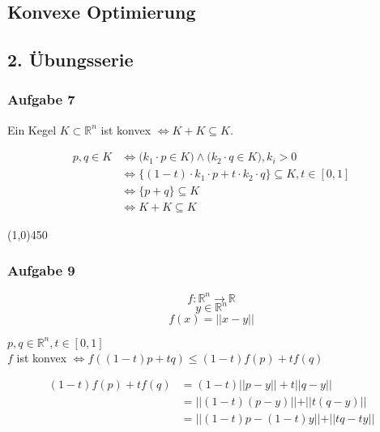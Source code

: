 \documentclass{article}
\newcommand{\hr}{\begin{center} \line(1,0){450} \end{center}}
\begin{document}
\begin{center}
	\section*{Konvexe Optimierung}
	\subsection*{2. Übungsserie}
\end{center}

\subsubsection*{Aufgabe 7}
\begin{center}
Ein Kegel $K \subset  \mathbb{R}^n$ ist konvex $\Leftrightarrow K + K \subseteq K$.
\end{center}


\begin{equation*}
\begin{split}
p,q \in K &\Leftrightarrow \big(k_1 \cdot p \in K\big) \land \big(k_2 \cdot q \in K\big) ,k_i > 0\\
&\Leftrightarrow \{ (1-t)\cdot k_1\cdot p + t\cdot k_2\cdot q \} \subseteq K,t \in \left[0,1 \right]\\
&\Leftrightarrow \{ p + q \} \subseteq K\\
&\Leftrightarrow K + K \subseteq K
\end{split}
\end{equation*}



\hr
\subsubsection*{Aufgabe 9}

	$$f: \mathbb{R}^n \rightarrow \mathbb{R}$$
	$$y \in \mathbb{R}^n$$
	$$f(x) = \vert\vert x -y \vert \vert$$

	\begin{center}
		$p,q \in \mathbb{R}^n,t \in \left[0,1 \right]$\\
		$f$ ist konvex $\Leftrightarrow f((1-t)p+tq) \leq (1-t)f(p)+ tf(q)$ 
	\end{center}
	
\begin{equation*}
\begin{split}
(1-t)f(p)+ tf(q) &=(1-t) \vert \vert p -y\vert \vert + t\vert \vert q -y\vert \vert\\
&=  \vert \vert (1-t) (p - y)\vert \vert + \vert \vert t(q -y)\vert \vert\\
&= \vert \vert  (1-t)p - (1-t)y\vert \vert + \vert \vert tq -ty\vert \vert \\
\end{split}
\end{equation*}
\end{document}
